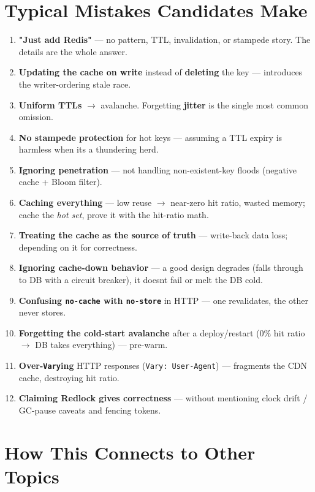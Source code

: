 \documentclass[11pt]{article}
\providecommand{\tightlist}{\setlength{\itemsep}{1pt}\setlength{\parskip}{0pt}}
\begin{document}
\section{Typical Mistakes Candidates Make}\label{typical-mistakes-candidates-make}

\begin{enumerate}
\def\labelenumi{\arabic{enumi}.}
\tightlist
\item
  \textbf{"Just add Redis"} --- no pattern, TTL, invalidation, or stampede story. The details are the whole answer.
\item
  \textbf{Updating the cache on write} instead of \textbf{deleting} the key --- introduces the writer-ordering stale race.
\item
  \textbf{Uniform TTLs} \(\rightarrow\) avalanche. Forgetting \textbf{jitter} is the single most common omission.
\item
  \textbf{No stampede protection} for hot keys --- assuming a TTL expiry is harmless when it\textquotesingle s a thundering herd.
\item
  \textbf{Ignoring penetration} --- not handling non-existent-key floods (negative cache + Bloom filter).
\item
  \textbf{Caching everything} --- low reuse \(\rightarrow\) near-zero hit ratio, wasted memory; cache the \emph{hot set}, prove it with the hit-ratio math.
\item
  \textbf{Treating the cache as the source of truth} --- write-back data loss; depending on it for correctness.
\item
  \textbf{Ignoring cache-down behavior} --- a good design degrades (falls through to DB with a circuit breaker), it doesn\textquotesingle t fail or melt the DB cold.
\item
  \textbf{Confusing \texttt{no-cache} with \texttt{no-store}} in HTTP --- one revalidates, the other never stores.
\item
  \textbf{Forgetting the cold-start avalanche} after a deploy/restart (0\% hit ratio \(\rightarrow\) DB takes everything) --- pre-warm.
\item
  \textbf{Over-\texttt{Vary}ing} HTTP responses (\texttt{Vary:\ User-Agent}) --- fragments the CDN cache, destroying hit ratio.
\item
  \textbf{Claiming Redlock gives correctness} --- without mentioning clock drift / GC-pause caveats and fencing tokens.
\end{enumerate}

\section{How This Connects to Other Topics}\label{how-this-connects-to-other-topics}
\end{document}

